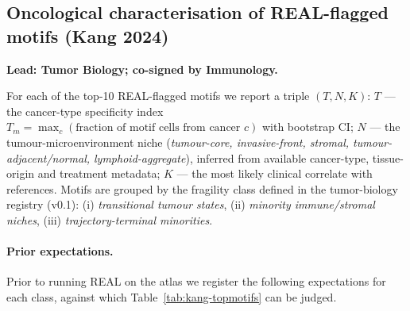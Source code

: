 

\subsection{Oncological characterisation of REAL-flagged motifs (Kang 2024)}
\label{sec:kang-oncology}

\textbf{Lead: Tumor Biology; co-signed by Immunology.}

For each of the top-10 REAL-flagged motifs we report a triple $(T, N, K)$:
$T$ --- the cancer-type specificity index $T_m = \max_c (\text{fraction of motif cells from cancer } c)$ with bootstrap CI; $N$ --- the tumour-microenvironment niche (\emph{tumour-core, invasive-front, stromal, tumour-adjacent/normal, lymphoid-aggregate}), inferred from available cancer-type, tissue-origin and treatment metadata; $K$ --- the most likely clinical correlate with references. Motifs are grouped by the fragility class defined in the tumor-biology registry (v0.1): (i) \emph{transitional tumour states}, (ii) \emph{minority immune/stromal niches}, (iii) \emph{trajectory-terminal minorities}.

\paragraph{Prior expectations.} Prior to running REAL on the atlas we register the following expectations for each class, against which Table~\ref{tab:kang-topmotifs} can be judged.

